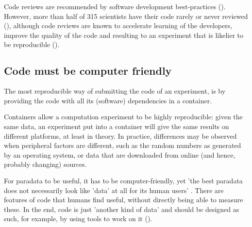 Code reviews are recommended by software development 
best-practices (\cite{wilson2014best}).
However, more than half of 315 scientists 
have their code rarely or never reviewed (\cite{vable2021code}),
although code reviews are known to
accelerate learning of the developers,
improve the quality of the code
and resulting to an experiment that is likelier to be reproducible
(\cite{vable2021code}).

\subsection{Code must be computer friendly}


The most reproducible way of submitting the code of an experiment,
is by providing the code with all its (software) dependencies 
in a container.


Containers allow a computation experiment to be highly reproducible:
given the same data, an experiment put into a container will give
the same results on different platforms, at least in theory.
In practice, differences may be observed when peripheral factors
are different, such as the random numbers as generated by an operating
system, or data that are downloaded from online (and hence, probably changing) sources.


For paradata to be useful, it has to be computer-friendly, yet 
'the best paradata does not necessarily look like 'data' at all for its
human users' \cite{huvila2022improving}.
There are features of code that humans find useful,
without directly being able to measure these.
In the end, code is just 'another kind of data' and should be designed 
as such, for example, by using tools to work on it (\cite{wilson2022twelve}).

